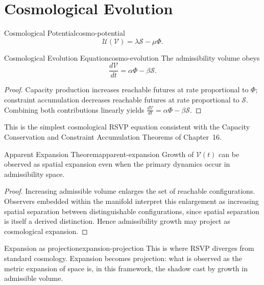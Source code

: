 \documentclass[12pt,twoside,openright]{book}
\begin{document}
\section{Cosmological Evolution}
\label{sec:ch18-evolution}

\begin{definition}{Cosmological Potential}{cosmo-potential}
  \[
    \mathcal{U}(\mathcal{V}) = \lambda \mathcal{S} - \mu \Phi.
  \]
\end{definition}

\begin{theorem}{Cosmological Evolution Equation}{cosmo-evolution}
  The admissibility volume obeys
  \[
    \frac{d\mathcal{V}}{dt} = \alpha \Phi - \beta \mathcal{S}.
  \]
\end{theorem}

\begin{proof}
  Capacity production increases reachable futures at rate
  proportional to $\Phi$; constraint accumulation decreases
  reachable futures at rate proportional to $\mathcal{S}$.
  Combining both contributions linearly yields
  $\frac{d\mathcal{V}}{dt} = \alpha\Phi - \beta\mathcal{S}$.
\end{proof}

This is the simplest cosmological RSVP equation consistent
with the Capacity Conservation and Constraint Accumulation
Theorems of Chapter~16.

\begin{theorem}{Apparent Expansion Theorem}{apparent-expansion}
  Growth of $\mathcal{V}(t)$ can be observed as spatial
  expansion even when the primary dynamics occur in
  admissibility space.
\end{theorem}

\begin{proof}
  Increasing admissible volume enlarges the set of
  reachable configurations. Observers embedded within the
  manifold interpret this enlargement as increasing spatial
  separation between distinguishable configurations, since
  spatial separation is itself a derived distinction.
  Hence admissibility growth may project as cosmological
  expansion.
\end{proof}

\begin{remark}{Expansion as projection}{expansion-projection}
  This is where RSVP diverges from standard cosmology.
  Expansion becomes projection: what is observed as the
  metric expansion of space is, in this framework, the
  shadow cast by growth in admissible volume.
\end{remark}
\end{document}
